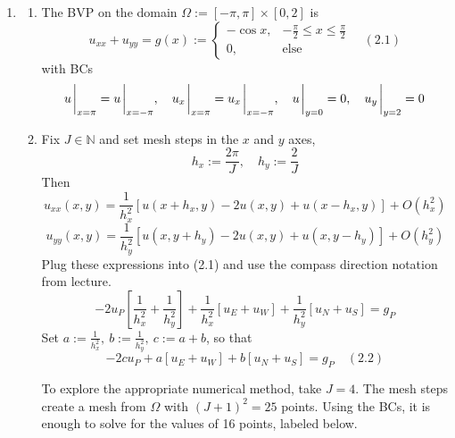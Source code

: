 \documentclass{article}
\def\mbb#1{\mathbb{#1}}
\def\bN{\mbb{N}}
\newcommand{\sbr}[1]{\left[#1\right]}
\begin{document}
\begin{enumerate}
\begin{enumerate}
\end{enumerate}



\item 

\begin{enumerate}
	
	
	
	\item The BVP on the domain $\Omega:=[-\pi,\pi]\times[0,2]$ is
	$$u_{xx} + u_{yy} = g(x) :=
	\begin{cases}
		-\cos x, & -\frac\pi2 \le x \le \frac\pi2\\
		0, & \text{else}
	\end{cases} \quad (2.1)$$
	with BCs
	$$u\eval_{x=\pi} = u\eval_{x=-\pi},
	\quad u_x\eval_{x=\pi} = u_x\eval_{x=-\pi},
	\quad u\eval_{y=0} = 0,
	\quad u_y\eval_{y=2} = 0$$
	
	
	
	\item Fix $J\in\bN$ and set mesh steps in the $x$ and $y$ axes,
	$$h_x := \frac{2\pi}{J},
	\quad h_y := \frac{2}{J}$$
	Then
	$$u_{xx}(x,y) = \frac{1}{h_x^2}\sbr{u(x+h_x,y) - 2u(x,y) + u(x-h_x,y)} + O(h_x^2)$$
	$$u_{yy}(x,y) = \frac{1}{h_y^2}\sbr{u(x,y+h_y) - 2u(x,y) + u(x,y-h_y)} + O(h_y^2)$$
	Plug these expressions into (2.1) and use the compass direction notation from lecture.
	$$-2u_P\sbr{\frac{1}{h_x^2} + \frac{1}{h_y^2}} + \frac{1}{h_x^2}[u_E + u_W] + \frac{1}{h_y^2}[u_N + u_S] = g_P$$
	Set $a:=\frac{1}{h_x^2},~b:=\frac{1}{h_y^2},~c:=a+b$, so that
	$$-2cu_P + a[u_E + u_W] + b[u_N + u_S] = g_P \quad (2.2)$$
	
	To explore the appropriate numerical method, take $J=4$. The mesh steps create a mesh from $\Omega$ with $(J+1)^2=25$ points. Using the BCs, it is enough to solve for the values of 16 points, labeled below.
	

\end{enumerate}
\end{enumerate}
\end{document}
